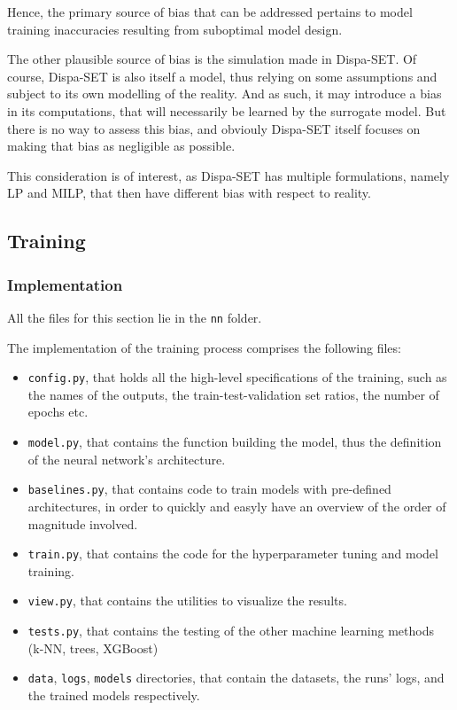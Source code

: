 Hence, the primary source of bias that can be addressed pertains to model training inaccuracies resulting from suboptimal model design.

The other plausible source of bias is the simulation made in Dispa-SET. Of course, Dispa-SET is also itself a model, thus relying on some assumptions and subject to its own modelling of the reality. And as such, it may introduce a bias in its computations, that will necessarily be learned by the surrogate model. But there is no way to assess this bias, and obviouly Dispa-SET itself focuses on making that bias as negligible as possible.

This consideration is of interest, as Dispa-SET has multiple formulations, namely LP and MILP, that then have different bias with respect to reality.

\subsection{Training}

\subsubsection{Implementation}

All the files for this section lie in the \texttt{nn} folder.

The implementation of the training process comprises the following files:
\begin{itemize}
    \item \texttt{config.py}, that holds all the high-level specifications of the training, such as the names of the outputs, the train-test-validation set ratios, the number of epochs etc.
    \item \texttt{model.py}, that contains the function building the model, thus the definition of the neural network's architecture.
    \item \texttt{baselines.py}, that contains code to train models with pre-defined architectures, in order to quickly and easyly have an overview of the order of magnitude involved.
    \item \texttt{train.py}, that contains the code for the hyperparameter tuning and model training.
    \item \texttt{view.py}, that contains the utilities to visualize the results.
    \item \texttt{tests.py}, that contains the testing of the other machine learning methods (k-NN, trees, XGBoost)
    \item \texttt{data}, \texttt{logs}, \texttt{models} directories, that contain the datasets, the runs' logs, and the trained models respectively.
\end{itemize}

